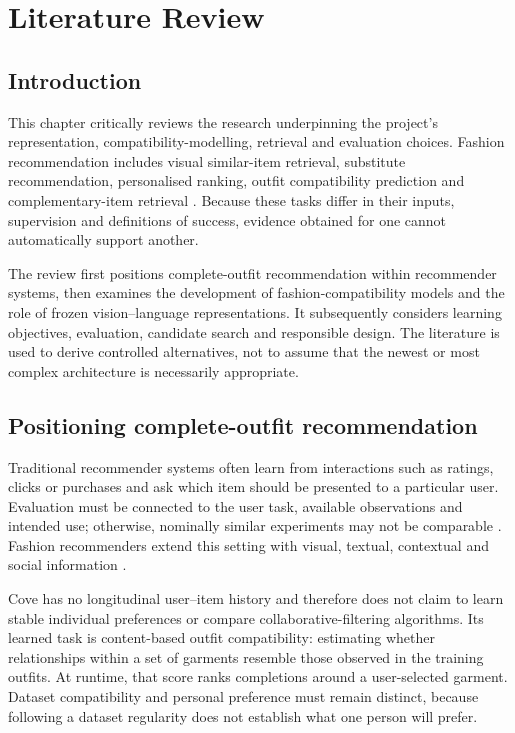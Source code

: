 \chapter{Literature Review}

\section{Introduction}

This chapter critically reviews the research underpinning the project's
representation, compatibility-modelling, retrieval and evaluation choices.
Fashion recommendation includes visual similar-item retrieval, substitute
recommendation, personalised ranking, outfit compatibility prediction and
complementary-item retrieval \parencite{deldjoo2023review,sarkar2023outfittransformer}.
Because these tasks differ in their inputs, supervision and definitions of
success, evidence obtained for one cannot automatically support another.

The review first positions complete-outfit recommendation within recommender
systems, then examines the development of fashion-compatibility models and the
role of frozen vision--language representations. It subsequently considers
learning objectives, evaluation, candidate search and responsible design. The
literature is used to derive controlled alternatives, not to assume that the
newest or most complex architecture is necessarily appropriate.

\section{Positioning complete-outfit recommendation}

Traditional recommender systems often learn from interactions such as ratings,
clicks or purchases and ask which item should be presented to a particular
user. Evaluation must be connected to the user task, available observations and
intended use; otherwise, nominally similar experiments may not be comparable
\parencite{herlocker2004evaluation}. Fashion recommenders extend this setting
with visual, textual, contextual and social information
\parencite{deldjoo2023review}.

Cove has no longitudinal user--item history and therefore does not claim to
learn stable individual preferences or compare collaborative-filtering
algorithms. Its learned task is content-based outfit compatibility: estimating
whether relationships within a set of garments resemble those observed in the
training outfits. At runtime, that score ranks completions around a
user-selected garment. Dataset compatibility and personal preference must
remain distinct, because following a dataset regularity does not establish what
one person will prefer.

